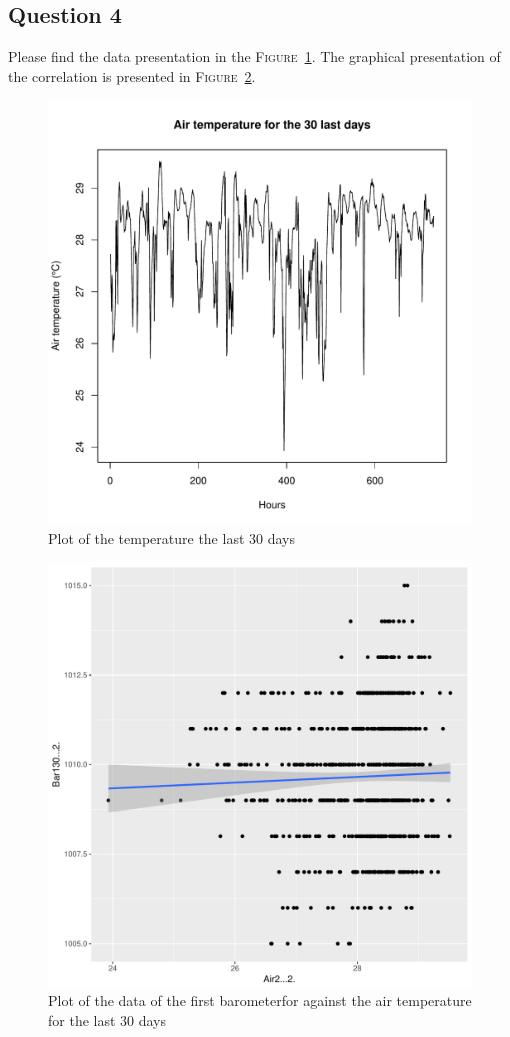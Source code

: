 \documentclass[12pt,a4paper]{article}
\begin{document}
\subsection*{Question 4}
Please find the data presentation in the \textsc{Figure}~\ref{air2}. The graphical presentation of the correlation is presented in \textsc{Figure}~\ref{prestemp}.

\begin{figure}
    \begin{center}
        \includegraphics[width=0.6\linewidth]{Air2.pdf}
        \caption{Plot of the temperature the last 30 days}
        \label{air2}
    \end{center}
\end{figure}
\begin{figure}
    \begin{center}
        \includegraphics[width=0.6\linewidth]{PresTemp.pdf}
        \caption{Plot of the data of the first barometerfor against the air temperature for the last 30 days}
        \label{prestemp}
    \end{center}
\end{figure}
\end{document}
